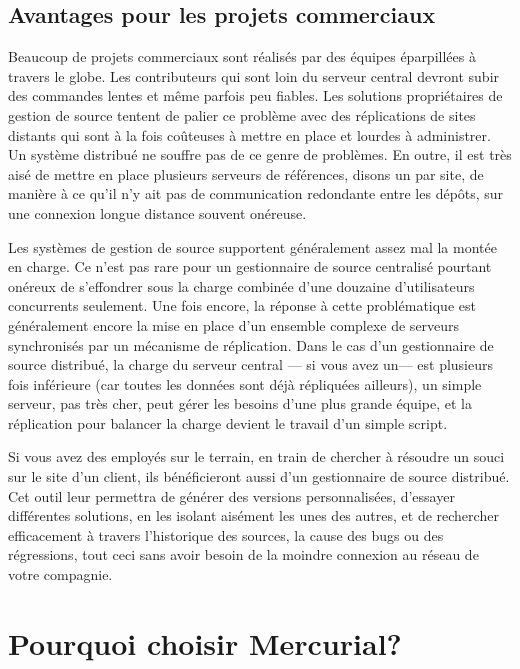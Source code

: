 \subsection{Avantages pour les projets commerciaux}

Beaucoup de projets commerciaux sont réalisés par des équipes éparpillées
à travers le globe. Les contributeurs qui sont loin du serveur central
devront subir des commandes lentes et même parfois peu fiables. Les 
solutions propriétaires de gestion de source tentent de palier ce problème 
avec des réplications de sites distants qui sont à la fois coûteuses à mettre
en place et lourdes à administrer. Un système distribué ne souffre pas
de ce genre de problèmes. En outre, il est très aisé de mettre en place
plusieurs serveurs de références, disons un par site, de manière à ce qu'il
n'y ait pas de communication redondante entre les dépôts, sur une connexion
longue distance souvent onéreuse.

Les systèmes de gestion de source supportent généralement assez mal la 
montée en charge. Ce n'est pas rare pour un gestionnaire de source centralisé 
pourtant onéreux de s'effondrer sous la charge combinée d'une douzaine 
d'utilisateurs concurrents seulement. Une fois encore, la réponse à cette problématique 
est généralement encore la mise en place d'un ensemble complexe de serveurs
synchronisés par un mécanisme de réplication. Dans le cas d'un gestionnaire
de source distribué, la charge du serveur central --- si vous avez un--- est
plusieurs fois inférieure (car toutes les données sont déjà répliquées ailleurs),
un simple serveur, pas très cher, peut gérer les besoins d'une plus grande
équipe, et la réplication pour balancer la charge devient le
travail d'un simple script.

Si vous avez des employés sur le terrain, en train de chercher à résoudre un souci sur
le site d'un client, ils bénéficieront aussi d'un gestionnaire de source
distribué. Cet outil leur permettra de générer des versions personnalisées,
d'essayer différentes solutions, en les isolant aisément les unes des autres,
et de rechercher efficacement à travers l'historique des sources, la cause
des bugs ou des régressions, tout ceci sans avoir besoin de la moindre 
connexion au réseau de votre compagnie.

\section{Pourquoi choisir Mercurial?}

